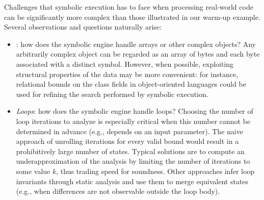 Challenges that symbolic execution has to face when processing real-world code can be significantly more complex than those illustrated in our warm-up example. Several observations and questions naturally arise:

\begin{itemize}

\item {}: how does the symbolic engine handle arrays or other complex objects?
Any arbitrarily complex object can be regarded as an array of bytes and each byte associated with a distinct symbol. However, when possible, exploiting structural properties of the data may be more convenient: for instance, relational bounds on the class fields in object-oriented languages could be used for refining the search performed by symbolic execution.
\vspace{1mm}

  \item {\em Loops}: how does the symbolic engine handle loops?
Choosing the number of loop iterations to analyze is especially critical when this number cannot be determined in advance (e.g., depends on an input parameter). The naive approach of unrolling iterations for every valid bound would result in a prohibitively large number of states. Typical solutions are to compute an underapproximation of the analysis by limiting the number of iterations to some value $k$, thus trading speed for soundness.  Other approaches infer loop invariants through static analysis  and use them to merge equivalent states (e.g., when differences are not observable outside the loop body).
\vspace{1mm}

\end{itemize}
